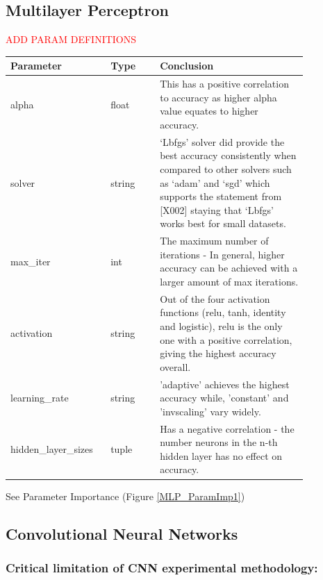 \documentclass[11pt]{article}
\begin{document}
\subsection{Multilayer Perceptron}
\label{MLPSection}
\textcolor{red}{ADD PARAM DEFINITIONS}
\begin{table}[ht]
  \centering
  \begin{tabular}{|p{0.25\linewidth} | p{0.15 \linewidth} | p{0.45\linewidth}|} 
    \hline
    \textbf{Parameter} & \textbf{Type} & \textbf{Conclusion} \\ \hline
    alpha & float & This has a positive correlation to accuracy as higher alpha value equates to higher accuracy. \\ \hline 
    solver & string & ‘Lbfgs’ solver did provide the best accuracy consistently when compared to other solvers such as ‘adam’ and ‘sgd’ which supports the statement from [X002] staying that ‘Lbfgs’ works best for small datasets. \\ \hline
    max\_iter & int & The maximum number of iterations - In general, higher accuracy can be achieved with a larger amount of max iterations. \\ \hline
    activation & string & Out of the four activation functions (relu, tanh, identity and logistic), relu is the only one with a positive correlation, giving the highest accuracy overall. \\ \hline  
    learning\_rate & string & 'adaptive' achieves the highest accuracy while, 'constant' and 'invscaling' vary widely. \\ \hline  
    hidden\_layer\_sizes & tuple & Has a negative correlation - the number neurons in the n-th hidden layer has no effect on accuracy. \\ \hline
  \end{tabular}
\end{table}\label{MLP_Analysis_Table}
\FloatBarrier
See Parameter Importance (Figure \ref{MLP_ParamImp1})

\newpage
\subsection{Convolutional Neural Networks}
\subsubsection{Critical limitation of CNN experimental methodology:}
\end{document}
